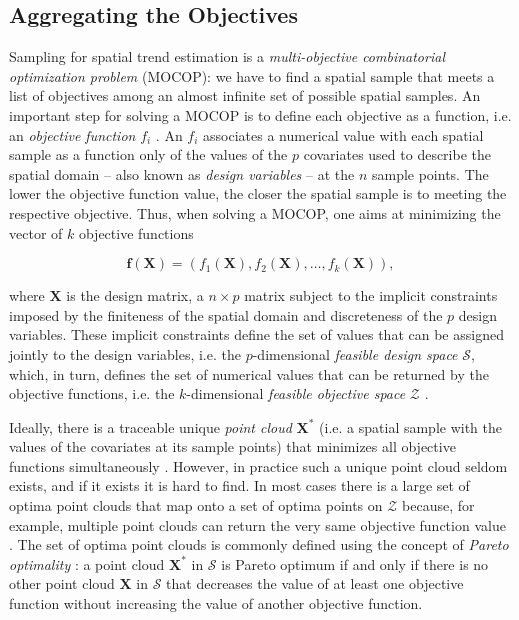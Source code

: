 \subsection{Aggregating the Objectives}

Sampling for spatial trend estimation is a \emph{multi-objective combinatorial optimization problem} (MOCOP): 
we have to find a spatial sample that meets a list of objectives among an almost infinite set of possible 
spatial samples. An important step for solving a MOCOP is to define each objective as a function, i.e. an 
\emph{objective function} $f_i$ \cite{Arora2011}. An $f_i$ associates a numerical value with each spatial 
sample as a function only of the values of the $p$ covariates used to describe the spatial domain -- also 
known as \emph{design variables} \cite{Arora2011} -- at the $n$ sample points. The lower the objective 
function value, the closer the spatial sample is to meeting the respective objective. Thus, when solving a 
MOCOP, one aims at minimizing the vector of $k$ objective functions \cite{Arora2011}

\begin{equation}
 \boldsymbol{f}(\boldsymbol{X}) = (f_1(\boldsymbol{X}), f_2(\boldsymbol{X}), \ldots, f_k(\boldsymbol{X})),
\end{equation}

\noindent where $\boldsymbol{X}$ is the design matrix, a $n \times p$ matrix subject to the implicit 
constraints imposed by the finiteness of the spatial domain and discreteness of the $p$ design variables. 
These implicit constraints define the set of values that can be assigned jointly to the design variables, i.e. 
the $p$-dimensional \emph{feasible design space} $\mathcal{S}$, which, in turn, defines the set of numerical 
values that can be returned by the objective functions, i.e. the $k$-dimensional \emph{feasible objective 
space} $\mathcal{Z}$ \cite{MarlerEtAl2004}.

Ideally, there is a traceable unique \emph{point cloud} $\boldsymbol{X}^*$ (i.e. a spatial sample with the 
values of the covariates at its sample points) that minimizes all objective functions simultaneously 
\cite{MarlerEtAl2009}. However, in practice such a unique point cloud seldom exists, and if it exists it is 
hard to find. In most cases there is a large set of optima point clouds that map onto a set of optima points 
on $\mathcal{Z}$ because, for example, multiple point clouds can return the very same objective function value 
\cite{Arora2011}. The set of optima point clouds is commonly defined using the concept of \emph{Pareto 
optimality} \cite{MarlerEtAl2004}: a point cloud $\boldsymbol{X}^*$ in $\mathcal{S}$ is Pareto optimum if and 
only if there is no other point cloud $\boldsymbol{X}$ in $\mathcal{S}$ that decreases the value of at least 
one objective function without increasing the value of another objective function.

